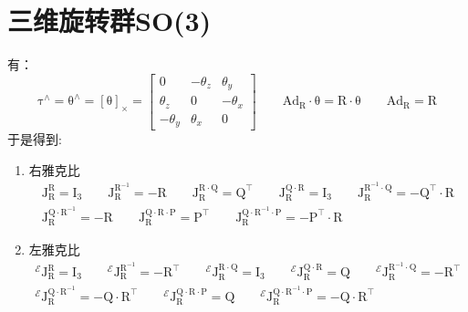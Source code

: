 \documentclass[12pt, onecolumn]{article}
\newcommand\normf{\fangsong}
\newcommand\skewmat[1]{\left[ #1 \right]_\times}
\newcommand\liehat[1]{#1^{\land}}
\newcommand\bsm[1]{\boldsymbol{\mathrm{#1}}}
\begin{document}
	\section{\normf 三维旋转群SO(3)}
	有：
	\begin{equation}
	\liehat{\bsm{\tau}}=\liehat{\bsm{\theta}}=\skewmat{\bsm{\theta}}=\begin{bmatrix}
	0&-\theta_z&\theta_y\\
	\theta_z&0&-\theta_x\\
	-\theta_y&\theta_x&0
	\end{bmatrix}
	\qquad
	\bsm{Ad}_{\bsm{R}}\cdot\bsm{\theta}=\bsm{R}\cdot\bsm{\theta}
	\qquad
	\bsm{Ad}_{\bsm{R}}=\bsm{R}
	\end{equation}
		于是得到:
	\begin{enumerate}
	\item 右雅克比
	\begin{equation}
	\begin{gathered}
	\bsm{J}_{\bsm{R}}^{\bsm{R}}=\bsm{I}_3
	\qquad
	\bsm{J}_{\bsm{R}}^{\bsm{R}^{-1}}=-\bsm{R}
	\qquad
	\bsm{J}_{\bsm{R}}^{\bsm{R}\cdot\bsm{Q}}=\bsm{Q}^\top
	\qquad
	\bsm{J}_{\bsm{R}}^{\bsm{Q}\cdot\bsm{R}}=\bsm{I}_3
	\qquad
	\bsm{J}_{\bsm{R}}^{\bsm{R}^{-1}\cdot\bsm{Q}}=-\bsm{Q}^\top\cdot\bsm{R}
	\\
	\bsm{J}_{\bsm{R}}^{\bsm{Q}\cdot\bsm{R}^{-1}}=-\bsm{R}
	\qquad
	\bsm{J}_{\bsm{R}}^{\bsm{Q}\cdot\bsm{R}\cdot\bsm{P}}=\bsm{P}^\top
	\qquad
	\bsm{J}_{\bsm{R}}^{\bsm{Q}\cdot\bsm{R}^{-1}\cdot\bsm{P}}=
	-\bsm{P}^\top\cdot\bsm{R}
	\end{gathered}
	\end{equation}

	\item 左雅克比
	\begin{equation}
	\begin{gathered}
	^\mathcal{E}\bsm{J}_{\bsm{R}}^{\bsm{R}}=\bsm{I}_3
	\qquad
	^\mathcal{E}\bsm{J}_{\bsm{R}}^{\bsm{R}^{-1}}=-\bsm{R}^\top
	\qquad
	^\mathcal{E}\bsm{J}_{\bsm{R}}^{\bsm{R}\cdot\bsm{Q}}=\bsm{I}_3
	\qquad
	^\mathcal{E}\bsm{J}_{\bsm{R}}^{\bsm{Q}\cdot\bsm{R}}=\bsm{Q}
	\qquad
	^\mathcal{E}\bsm{J}_{\bsm{R}}^{\bsm{R}^{-1}\cdot\bsm{Q}}=-\bsm{R}^\top
	\\
	^\mathcal{E}\bsm{J}_{\bsm{R}}^{\bsm{Q}\cdot\bsm{R}^{-1}}=-\bsm{Q}\cdot\bsm{R}^\top
	\qquad
	^\mathcal{E}\bsm{J}_{\bsm{R}}^{\bsm{Q}\cdot\bsm{R}\cdot\bsm{P}}=\bsm{Q}
	\qquad
	^\mathcal{E}\bsm{J}_{\bsm{R}}^{\bsm{Q}\cdot\bsm{R}^{-1}\cdot\bsm{P}}=-\bsm{Q}\cdot\bsm{R}^\top
	\end{gathered}
	\end{equation}
	\end{enumerate}
\end{document}
